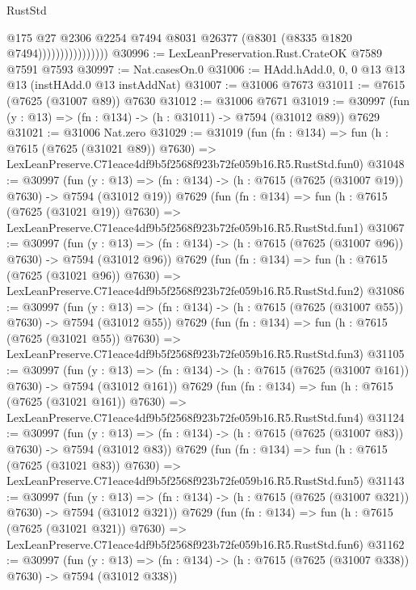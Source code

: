 \begin{lexlean}{RustStd}
\begin{coremodule}
                                @175
                                @27
                                @2306
                                @2254
                                @7494
                                @8031
                                @26377
                                (@8301 (@8335 @1820 @7494))))))))))))))))
@30996 := LexLeanPreservation.Rust.CrateOK @7589 @7591 @7593
@30997 := Nat.casesOn.{0}
@31006 := HAdd.hAdd.{0, 0, 0} @13 @13 @13 (instHAdd.{0} @13 instAddNat)
@31007 := @31006 @7673
@31011 := @7615 (@7625 (@31007 @89)) @7630
@31012 := @31006 @7671
@31019 := @30997 (fun (y : @13) => (fn : @134) -> (h : @31011) -> @7594 (@31012 @89)) @7629
@31021 := @31006 Nat.zero
@31029 := @31019
    (fun (fn : @134) =>
    fun (h : @7615 (@7625 (@31021 @89)) @7630) =>
    LexLeanPreserve.C71eace4df9b5f2568f923b72fe059b16.R5.RustStd.fun0)
@31048 := @30997
    (fun (y : @13) => (fn : @134) -> (h : @7615 (@7625 (@31007 @19)) @7630) -> @7594 (@31012 @19))
    @7629
    (fun (fn : @134) =>
    fun (h : @7615 (@7625 (@31021 @19)) @7630) =>
    LexLeanPreserve.C71eace4df9b5f2568f923b72fe059b16.R5.RustStd.fun1)
@31067 := @30997
    (fun (y : @13) => (fn : @134) -> (h : @7615 (@7625 (@31007 @96)) @7630) -> @7594 (@31012 @96))
    @7629
    (fun (fn : @134) =>
    fun (h : @7615 (@7625 (@31021 @96)) @7630) =>
    LexLeanPreserve.C71eace4df9b5f2568f923b72fe059b16.R5.RustStd.fun2)
@31086 := @30997
    (fun (y : @13) => (fn : @134) -> (h : @7615 (@7625 (@31007 @55)) @7630) -> @7594 (@31012 @55))
    @7629
    (fun (fn : @134) =>
    fun (h : @7615 (@7625 (@31021 @55)) @7630) =>
    LexLeanPreserve.C71eace4df9b5f2568f923b72fe059b16.R5.RustStd.fun3)
@31105 := @30997
    (fun (y : @13) => (fn : @134) -> (h : @7615 (@7625 (@31007 @161)) @7630) -> @7594 (@31012 @161))
    @7629
    (fun (fn : @134) =>
    fun (h : @7615 (@7625 (@31021 @161)) @7630) =>
    LexLeanPreserve.C71eace4df9b5f2568f923b72fe059b16.R5.RustStd.fun4)
@31124 := @30997
    (fun (y : @13) => (fn : @134) -> (h : @7615 (@7625 (@31007 @83)) @7630) -> @7594 (@31012 @83))
    @7629
    (fun (fn : @134) =>
    fun (h : @7615 (@7625 (@31021 @83)) @7630) =>
    LexLeanPreserve.C71eace4df9b5f2568f923b72fe059b16.R5.RustStd.fun5)
@31143 := @30997
    (fun (y : @13) => (fn : @134) -> (h : @7615 (@7625 (@31007 @321)) @7630) -> @7594 (@31012 @321))
    @7629
    (fun (fn : @134) =>
    fun (h : @7615 (@7625 (@31021 @321)) @7630) =>
    LexLeanPreserve.C71eace4df9b5f2568f923b72fe059b16.R5.RustStd.fun6)
@31162 := @30997
    (fun (y : @13) => (fn : @134) -> (h : @7615 (@7625 (@31007 @338)) @7630) -> @7594 (@31012 @338))

\end{coremodule}
\end{lexlean}
